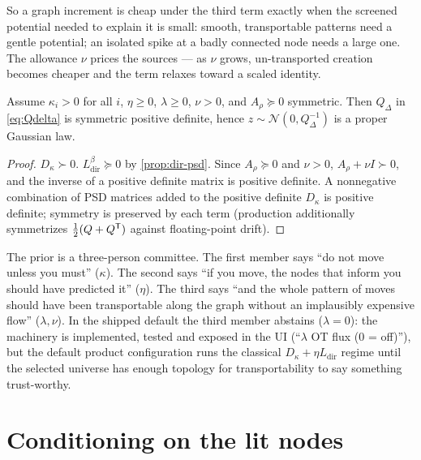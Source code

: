 \documentclass[11pt]{article}
\newcommand{\Ldir}{L_{\mathrm{dir}}}
\newcommand{\Qdel}{Q_{\Delta}}
\newcommand{\Arho}{A_{\rho}}
\begin{document}
So a graph increment is cheap under the third term exactly when the screened
potential needed to explain it is small: smooth, transportable patterns need a
gentle potential; an isolated spike at a badly connected node needs a large one.
The allowance $\nu$ prices the sources --- as $\nu$ grows, un-transported
creation becomes cheaper and the term relaxes toward a scaled identity.

\begin{proposition}
\label{prop:proper}
Assume $\kappa_i>0$ for all $i$, $\eta\ge0$, $\lambda\ge0$, $\nu>0$, and
$\Arho\succeq0$ symmetric. Then $\Qdel$ in \eqref{eq:Qdelta} is symmetric
positive definite, hence $z\sim\mathcal N(0,\Qdel^{-1})$ is a proper Gaussian
law.
\end{proposition}

\begin{proof}
$D_\kappa\succ0$. $\Ldir^{\beta}\succeq0$ by \cref{prop:dir-psd}. Since
$\Arho\succeq0$ and $\nu>0$, $\Arho+\nu I\succ0$, and the inverse of a
positive definite matrix is positive definite. A nonnegative combination of PSD
matrices added to the positive definite $D_\kappa$ is positive definite;
symmetry is preserved by each term (production additionally symmetrizes
$\tfrac12(Q+Q^{\mathsf{T}})$ against floating-point drift).
\end{proof}

\begin{heuristic}
The prior is a three-person committee. The first member says ``do not move
unless you must'' ($\kappa$). The second says ``if you move, the nodes that
inform you should have predicted it'' ($\eta$). The third says ``and the whole
pattern of moves should have been transportable along the graph without an
implausibly expensive flow'' ($\lambda,\nu$). In the shipped default the third
member abstains ($\lambda=0$): the machinery is implemented, tested and exposed
in the UI (``$\lambda$ OT flux (0 = off)''), but the default product
configuration runs the classical $D_\kappa+\eta\Ldir$ regime until the selected
universe has enough topology for transportability to say something trust-worthy.
\end{heuristic}

\section{Conditioning on the lit nodes}
\label{sec:posterior}
\end{document}
